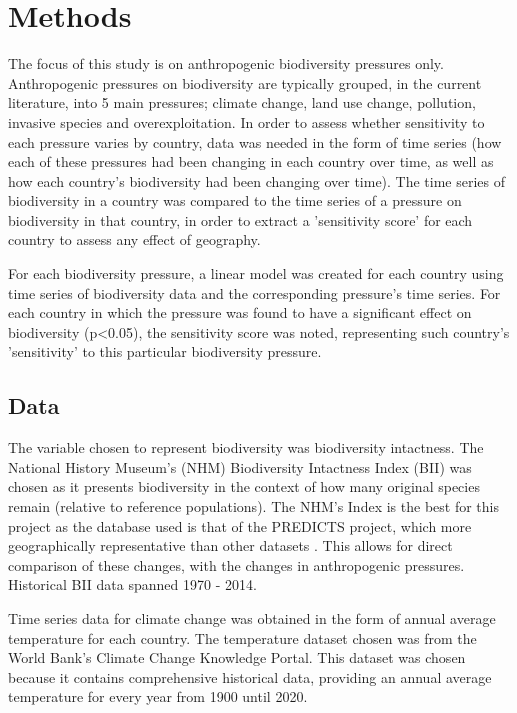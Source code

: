 \documentclass[11pt, a4paper, titlepage]{article}
\begin{document}
    \section*{Methods}

	The focus of this study is on anthropogenic biodiversity pressures only. Anthropogenic pressures on biodiversity are typically grouped, in the current literature, into 5 main pressures; climate change, land use change, pollution, invasive species and overexploitation. In order to assess whether sensitivity to each pressure varies by country, data was needed in the form of time series (how each of these pressures had been changing in each country over time, as well as how each country's biodiversity had been changing over time). The time series of biodiversity in a country was compared to the time series of a pressure on biodiversity in that country, in order to extract a 'sensitivity score' for each country to assess any effect of geography. \newline
	
	For each biodiversity pressure, a linear model was created for each country using time series of biodiversity data and the corresponding pressure's time series. For each country in which the pressure was found to have a significant effect on biodiversity (p<0.05), the sensitivity score was noted, representing such country's 'sensitivity' to this particular biodiversity pressure. \newline
	
	\subsection*{Data}
	
	The variable chosen to represent biodiversity was biodiversity intactness. The National History Museum's (NHM) Biodiversity Intactness Index (BII) was chosen as it presents biodiversity in the context of how many original species remain (relative to reference populations). The NHM's Index is the best for this project as the database used is that of the PREDICTS project, which more geographically representative than other datasets \cite{purvis2018modelling}. This allows for direct comparison of these changes, with the changes in anthropogenic pressures. Historical BII data spanned 1970 - 2014. \newline
	
	Time series data for climate change was obtained in the form of annual average temperature for each country. The temperature dataset chosen was from the World Bank's Climate Change Knowledge Portal. This dataset was chosen because it contains comprehensive historical data, providing an annual average temperature for every year from 1900 until 2020. \newline
	
\end{document}
